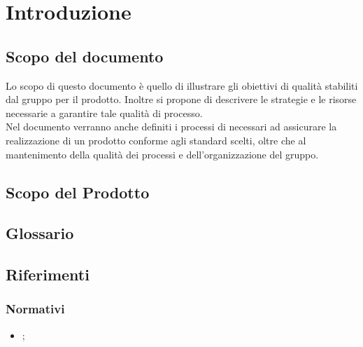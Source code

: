 \section{Introduzione}

\subsection{Scopo del documento}
Lo scopo di questo documento è quello di illustrare gli obiettivi di qualità stabiliti dal gruppo \GroupName{} per il prodotto. Inoltre si propone di descrivere le strategie e le risorse necessarie a garantire tale qualità di processo.\\
Nel documento verranno anche definiti i processi di \VV{} necessari ad assicurare la realizzazione di un prodotto conforme agli standard scelti, oltre che al mantenimento della qualità dei processi e dell'organizzazione del gruppo.

\subsection{Scopo del Prodotto}
\ScopoDelProdotto

\subsection{Glossario}
\GlossarioIntroduzione

\subsection{Riferimenti}
\subsubsection{Normativi}
\begin{itemize}
	\item \textbf{\NormeDiProgetto};
\end{itemize}

